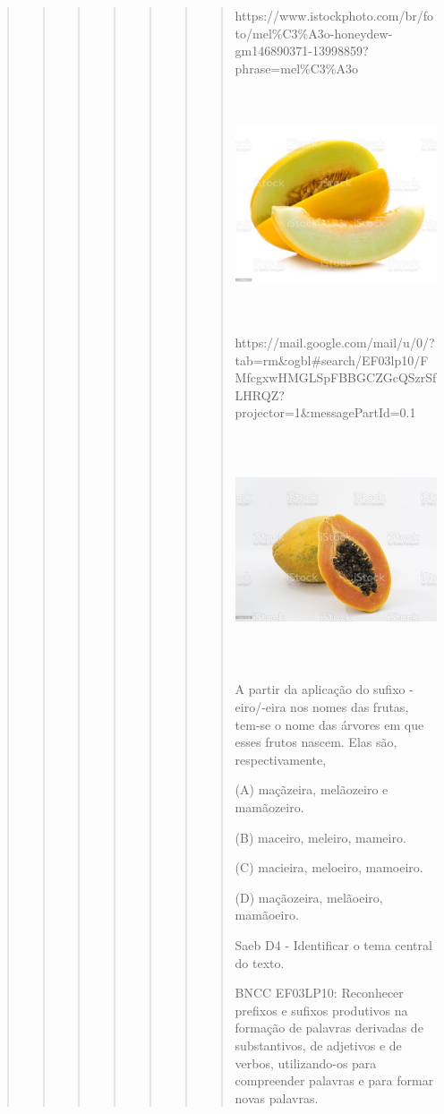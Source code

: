 \begin{quote}
\begin{quote}
\begin{quote}
\begin{quote}
\begin{quote}
\begin{quote}
\begin{quote}
https://www.istockphoto.com/br/foto/mel\%C3\%A3o-honeydew-gm146890371-13998859?phrase=mel\%C3\%A3o

\includegraphics[width=3.33412in,height=2.64722in]{media/image39.jpeg}

https://mail.google.com/mail/u/0/?tab=rm\&ogbl\#search/EF03lp10/FMfcgxwHMGLSpFBBGCZGcQSzrSfLHRQZ?projector=1\&messagePartId=0.1

\includegraphics[width=3.76501in,height=2.67500in]{media/image40.jpeg}

A partir da aplicação do sufixo -eiro/-eira nos nomes das frutas, tem-se
o nome das árvores em que esses frutos nascem. Elas são,
respectivamente,

(A) maçãzeira, melãozeiro e mamãozeiro.

(B) maceiro, meleiro, mameiro.

(C) macieira, meloeiro, mamoeiro.

(D) maçãozeira, melãoeiro, mamãoeiro.

Saeb D4 - Identificar o tema central do texto.

BNCC EF03LP10: Reconhecer prefixos e sufixos produtivos na formação de
palavras derivadas de substantivos, de adjetivos e de verbos,
utilizando-os para compreender palavras e para formar novas palavras.


\end{quote}
\end{quote}
\end{quote}
\end{quote}
\end{quote}
\end{quote}
\end{quote}

